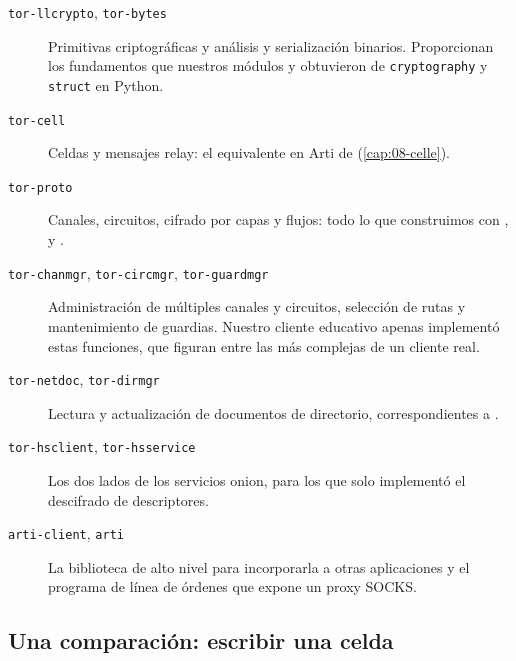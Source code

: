 \begin{description}
  \item[\texttt{tor-llcrypto}, \texttt{tor-bytes}] Primitivas criptográficas y análisis y serialización binarios. Proporcionan los fundamentos que nuestros módulos  y  obtuvieron de \texttt{cryptography} y \texttt{struct} en Python.
  \item[\texttt{tor-cell}] Celdas y mensajes relay: el equivalente en Arti de  (\cref{cap:08-celle}).
  \item[\texttt{tor-proto}] Canales, circuitos, cifrado por capas y flujos: todo lo que construimos con ,  y .
  \item[\texttt{tor-chanmgr}, \texttt{tor-circmgr}, \texttt{tor-guardmgr}] Administración de múltiples canales y circuitos, selección de rutas y mantenimiento de guardias. Nuestro cliente educativo apenas implementó estas funciones, que figuran entre las más complejas de un cliente real.
  \item[\texttt{tor-netdoc}, \texttt{tor-dirmgr}] Lectura y actualización de documentos de directorio, correspondientes a .
  \item[\texttt{tor-hsclient}, \texttt{tor-hsservice}] Los dos lados de los servicios onion, para los que  solo implementó el descifrado de descriptores.
  \item[\texttt{arti-client}, \texttt{arti}] La biblioteca de alto nivel para incorporarla a otras aplicaciones y el programa de línea de órdenes que expone un proxy SOCKS.
\end{description}

\subsection{Una comparación: escribir una celda}

